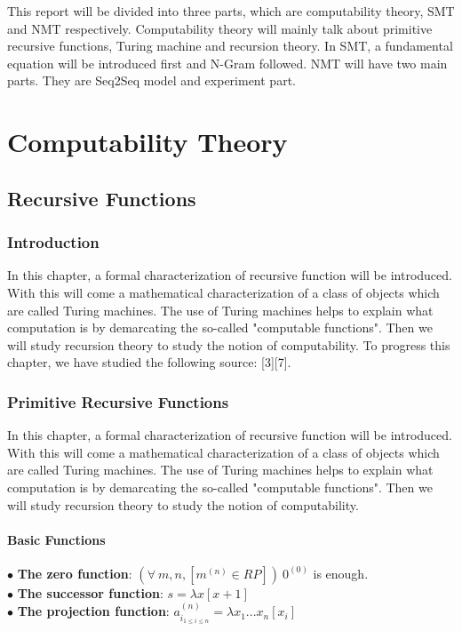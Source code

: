 This report will be divided into three parts, which are computability theory, SMT and NMT respectively. Computability theory will mainly talk about primitive recursive functions, Turing machine and recursion theory. In SMT, a fundamental equation will be introduced first and N-Gram followed. NMT will have two main parts. They are Seq2Seq model and experiment part. 




\part{Computability Theory}

\chapter{Recursive Functions}

\section*{Introduction}
In this chapter, a formal characterization of recursive function will be introduced. With this will come a mathematical characterization of a class of objects which are called Turing machines. The use of Turing machines helps to explain what computation is by demarcating the so-called "computable functions". Then we will study recursion theory to study the notion of computability. To progress this chapter, we have studied the following source: [3][7].

\minitoc

\section{Primitive Recursive Functions}
In this chapter, a formal characterization of recursive function will be introduced. With this will come a mathematical characterization of a class of objects which are called Turing machines. The use of Turing machines helps to explain what computation is by demarcating the so-called "computable functions". Then we will study recursion theory to study the notion of computability.
\subsection{Basic Functions}
$\bullet$ \textbf{The zero function}: $(\forall\ m,n, [m^{(n)}\in RP])\ 0^{(0)}$ is enough.\\
$\bullet$ \textbf{The successor function}: $s = \lambda x[x+1]$\\
$\bullet$ \textbf{The projection function}: $a_{i_{1\leq i \leq n}}^{(n)} = \lambda x_1 ... x_n[x_i]$
